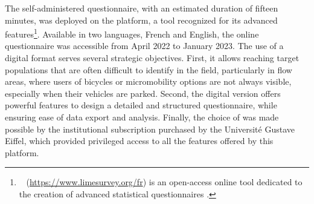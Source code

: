 \begin{refsegment}
The self-administered questionnaire, with an estimated duration of fifteen minutes, was deployed on the  platform, a tool recognized for its advanced features\footnote{~
     (\url{https://www.limesurvey.org/fr}) is an open-access online tool dedicated to the creation of advanced statistical questionnaires \textcolor{blue}{\autocite{limesurvey_limesurvey_nodate}}.
}. Available in two languages, French and English, the online questionnaire was accessible from April 2022 to January 2023. The use of a digital format serves several strategic objectives. First, it allows reaching target populations that are often difficult to identify in the field, particularly in flow areas, where users of bicycles or micromobility options are not always visible, especially when their vehicles are parked. Second, the digital version offers powerful features to design a detailed and structured questionnaire, while ensuring ease of data export and analysis. Finally, the choice of  was made possible by the institutional subscription purchased by the Université Gustave Eiffel, which provided privileged access to all the features offered by this platform.%


\end{refsegment}
